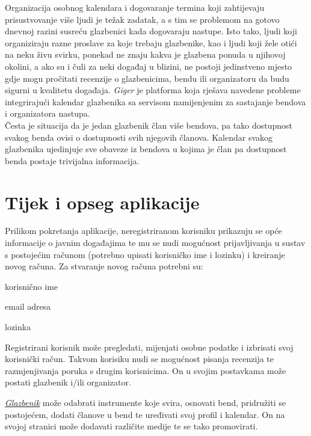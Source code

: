 		Organizacija osobnog kalendara i dogovaranje termina koji zahtijevaju prisustvovanje više ljudi je težak zadatak, a s tim se problemom na gotovo dnevnoj razini susreću glazbenici kada dogovaraju nastupe. Isto tako, ljudi koji organiziraju razne proslave za koje trebaju glazbenike, kao i ljudi koji žele otići na neku živu svirku, ponekad ne znaju kakva je glazbena ponuda u njihovoj okolini, a ako su i čuli za neki događaj u blizini, ne postoji jedinstveno mjesto gdje mogu pročitati recenzije o glazbenicima, bendu ili organizatoru da budu sigurni u kvalitetu događaja.
		\textit{Giger} je platforma koja rješava navedene probleme integrirajući kalendar glazbenika sa servisom namijenjenim za sastajanje bendova i organizatora nastupa. 
		\\
		
		Česta je situacija da je jedan glazbenik član više bendova, pa tako dostupnost svakog benda ovisi o dostupnosti svih njegovih članova.  Kalendar svakog glazbenika ujedinjuje sve obaveze iz bendova u kojima je član pa dostupnost benda postaje trivijalna informacija. 
		
		
		
		\section{Tijek i opseg aplikacije}
		
		Prilikom pokretanja aplikacije, neregistriranom korisniku prikazuju se opće informacije o javnim događajima te mu se nudi mogućnost prijavljivanja u sustav s postojećim računom (potrebno upisati korisničko ime i lozinku) i kreiranje novog računa. Za stvaranje novog računa potrebni su: 
		
		\begin{packed_item}
			\item korisnično ime
			\item email adresa
			\item lozinka
		\end{packed_item}
	
		Registrirani korisnik može pregledati, mijenjati osobne podatke i izbrisati svoj korisnički račun. Takvom korisiku nudi se mogućnost pisanja recenzija te razmjenjivanja poruka s drugim korisnicima. On u svojim postavkama može postati glazbenik i/ili organizator.
		
		\textit{\underline{Glazbenik}} može odabrati instrumente koje svira, osnovati bend, pridružiti se postojećem, dodati članove u bend te uređivati svoj profil i kalendar. On na svojoj stranici može dodavati različite medije te se tako promovirati. 
		
